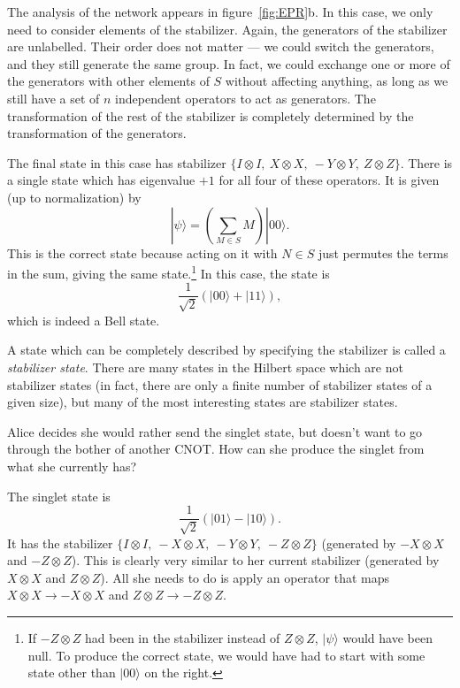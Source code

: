 The analysis of the network appears in figure~\ref{fig:EPR}b.
In this case, we only need to consider elements of the stabilizer.
Again, the generators of the stabilizer are unlabelled.  Their order
does not matter --- we could switch the generators, and they still
generate the same group.  In fact, we could exchange one or more of
the generators with other elements of $S$ without affecting anything,
as long as we still have a set of $n$ independent operators to act as
generators.  The transformation of the rest of the stabilizer is
completely determined by the transformation of the generators.

The final state in this case has stabilizer $\{I \otimes I,\ X \otimes
X,\ - Y \otimes Y,\ Z \otimes Z \}$.  There is a single state which
has eigenvalue $+1$ for all four of these operators.  It is given (up
to normalization) by
\begin{equation}
|\psi\rangle = \left( \sum_{M \in S} M \right) |00\rangle.
\end{equation}
This is the correct state because acting on it with $N \in S$ just
permutes the terms in the sum, giving the same state.\footnote{If $- Z
\otimes Z$ had been in the stabilizer instead of $Z \otimes Z$,
$|\psi\rangle$ would have been null.  To produce the correct state, we
would have had to start with some state other than $|00\rangle$ on the
right.}  In this case,
the state is
\begin{equation}
\frac{1}{\sqrt{2}} \left( |00\rangle + |11\rangle \right),
\end{equation}
which is indeed a Bell state.

A state which can be completely described by specifying the stabilizer
is called a {\em stabilizer state}.  There are many states in the
Hilbert space which are not stabilizer states (in fact, there are only
a finite number of stabilizer states of a given size), but many of the
most interesting states are stabilizer states.

\begin{example}
Alice decides she would rather send the singlet state, but doesn't
want to go through the bother of another CNOT.  How can she produce
the singlet from what she currently has?
\end{example}

The singlet state is
\begin{equation}
\frac{1}{\sqrt{2}} \left( |01\rangle - |10\rangle \right).
\end{equation}
It has the stabilizer $\{I \otimes I,\ - X \otimes X,\ - Y \otimes Y,\
- Z \otimes Z\}$ (generated by $- X \otimes X$ and $- Z \otimes Z$).
This is clearly very similar to her current stabilizer (generated by
$X \otimes X$ and $Z \otimes Z$).  All she needs to do is apply an
operator that maps $X \otimes X \rightarrow -X \otimes X$ and $Z
\otimes Z\rightarrow -Z \otimes Z$.

